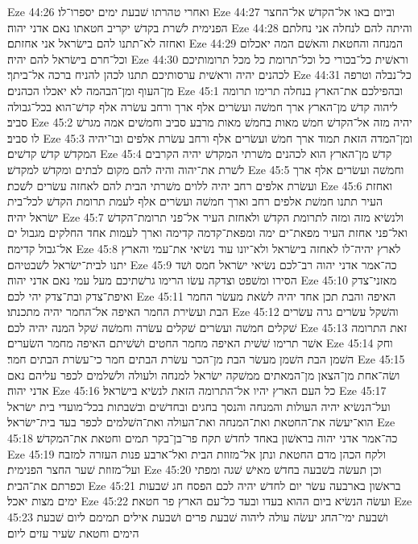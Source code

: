 Eze 44:26  ואחרי טהרתו שׁבעת ימים יספרו־לו׃
Eze 44:27  וביום באו אל־הקדשׁ אל־החצר הפנימית לשׁרת בקדשׁ יקריב חטאתו נאם אדני יהוה׃
Eze 44:28  והיתה להם לנחלה אני נחלתם ואחזה לא־תתנו להם בישׂראל אני אחזתם׃
Eze 44:29  המנחה והחטאת והאשׁם המה יאכלום וכל־חרם בישׂראל להם יהיה׃
Eze 44:30  וראשׁית כל־בכורי כל וכל־תרומת כל מכל תרומותיכם לכהנים יהיה וראשׁית ערסותיכם תתנו לכהן להניח ברכה אל־ביתך׃
Eze 44:31  כל־נבלה וטרפה מן־העוף ומן־הבהמה לא יאכלו הכהנים׃
Eze 45:1  ובהפילכם את־הארץ בנחלה תרימו תרומה ליהוה קדשׁ מן־הארץ ארך חמשׁה ועשׂרים אלף ארך ורחב עשׂרה אלף קדשׁ־הוא בכל־גבולה סביב׃
Eze 45:2  יהיה מזה אל־הקדשׁ חמשׁ מאות בחמשׁ מאות מרבע סביב וחמשׁים אמה מגרשׁ לו סביב׃
Eze 45:3  ומן־המדה הזאת תמוד ארך חמשׁ ועשׂרים אלף ורחב עשׂרת אלפים ובו־יהיה המקדשׁ קדשׁ קדשׁים׃
Eze 45:4  קדשׁ מן־הארץ הוא לכהנים משׁרתי המקדשׁ יהיה הקרבים לשׁרת את־יהוה והיה להם מקום לבתים ומקדשׁ למקדשׁ׃
Eze 45:5  וחמשׁה ועשׂרים אלף ארך ועשׂרת אלפים רחב יהיה ללוים משׁרתי הבית להם לאחזה עשׂרים לשׁכת׃
Eze 45:6  ואחזת העיר תתנו חמשׁת אלפים רחב וארך חמשׁה ועשׂרים אלף לעמת תרומת הקדשׁ לכל־בית ישׂראל יהיה׃
Eze 45:7  ולנשׂיא מזה ומזה לתרומת הקדשׁ ולאחזת העיר אל־פני תרומת־הקדשׁ ואל־פני אחזת העיר מפאת־ים ימה ומפאת־קדמה קדימה וארך לעמות אחד החלקים מגבול ים אל־גבול קדימה׃
Eze 45:8  לארץ יהיה־לו לאחזה בישׂראל ולא־יונו עוד נשׂיאי את־עמי והארץ יתנו לבית־ישׂראל לשׁבטיהם׃
Eze 45:9  כה־אמר אדני יהוה רב־לכם נשׂיאי ישׂראל חמס ושׁד הסירו ומשׁפט וצדקה עשׂו הרימו גרשׁתיכם מעל עמי נאם אדני יהוה׃
Eze 45:10  מאזני־צדק ואיפת־צדק ובת־צדק יהי לכם׃
Eze 45:11  האיפה והבת תכן אחד יהיה לשׂאת מעשׂר החמר הבת ועשׂירת החמר האיפה אל־החמר יהיה מתכנתו׃
Eze 45:12  והשׁקל עשׂרים גרה עשׂרים שׁקלים חמשׁה ועשׂרים שׁקלים עשׂרה וחמשׁה שׁקל המנה יהיה לכם׃
Eze 45:13  זאת התרומה אשׁר תרימו שׁשׁית האיפה מחמר החטים ושׁשׁיתם האיפה מחמר השׂערים׃
Eze 45:14  וחק השׁמן הבת השׁמן מעשׂר הבת מן־הכר עשׂרת הבתים חמר כי־עשׂרת הבתים חמר׃
Eze 45:15  ושׂה־אחת מן־הצאן מן־המאתים ממשׁקה ישׂראל למנחה ולעולה ולשׁלמים לכפר עליהם נאם אדני יהוה׃
Eze 45:16  כל העם הארץ יהיו אל־התרומה הזאת לנשׂיא בישׂראל׃
Eze 45:17  ועל־הנשׂיא יהיה העולות והמנחה והנסך בחגים ובחדשׁים ובשׁבתות בכל־מועדי בית ישׂראל הוא־יעשׂה את־החטאת ואת־המנחה ואת־העולה ואת־השׁלמים לכפר בעד בית־ישׂראל׃
Eze 45:18  כה־אמר אדני יהוה בראשׁון באחד לחדשׁ תקח פר־בן־בקר תמים וחטאת את־המקדשׁ׃
Eze 45:19  ולקח הכהן מדם החטאת ונתן אל־מזוזת הבית ואל־ארבע פנות העזרה למזבח ועל־מזוזת שׁער החצר הפנימית׃
Eze 45:20  וכן תעשׂה בשׁבעה בחדשׁ מאישׁ שׁגה ומפתי וכפרתם את־הבית׃
Eze 45:21  בראשׁון בארבעה עשׂר יום לחדשׁ יהיה לכם הפסח חג שׁבעות ימים מצות יאכל׃
Eze 45:22  ועשׂה הנשׂיא ביום ההוא בעדו ובעד כל־עם הארץ פר חטאת׃
Eze 45:23  ושׁבעת ימי־החג יעשׂה עולה ליהוה שׁבעת פרים ושׁבעת אילים תמימם ליום שׁבעת הימים וחטאת שׂעיר עזים ליום׃
